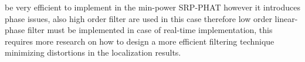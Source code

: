 be very efficient to implement in the min-power SRP-PHAT however it introduces phase issues, also high order filter are used in this case therefore low order linear-phase filter must be implemented in case of real-time implementation, this requires more research on how to design a more efficient filtering technique minimizing distortions in the localization results. 